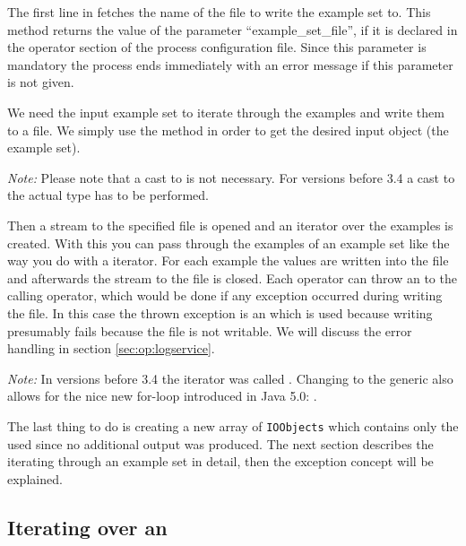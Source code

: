
The first line in  fetches the name of the file to
write the example set to. This method returns the value of the
parameter ``example\_set\_file'', if it is declared in the operator section
of the process configuration file. Since this parameter is mandatory
the process ends immediately with an error message if this parameter is not given.

We need the input example set to iterate through the examples and write them
to a file. We simply use the  method in order 
to get the desired input object (the example set). 

\emph{Note:} Please note that a cast to  is not necessary. 
For \rapidminer versions before 3.4 a cast to the actual type has to be performed.

Then a stream to the specified file is opened
and an iterator over the examples is created. With this
 you can pass through the examples of an example set
like the way you do with a  iterator. For each example the
values are written into the file and afterwards the stream to the file
is closed. Each operator can throw an  to the
calling operator, which would be done if any exception occurred during
writing the file. In this case the thrown exception is an 
which is used because writing presumably fails because the file is not
writable. We will discuss the error handling in section
\ref{sec:op:logservice}.

\emph{Note:} In versions before 3.4 the iterator was called .
Changing to the generic  also allows for the nice new
for-loop introduced in Java 5.0: .

The last thing to do is creating a new array of 
{\tt IOObjects} which contains only the used  since no
additional output was produced.
The next section describes the iterating through an example set in detail,
then the exception concept will be explained.



\subsection{Iterating over an }


